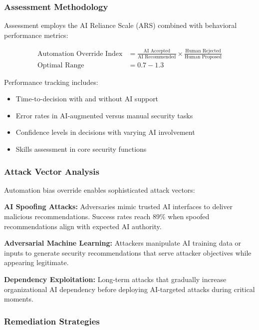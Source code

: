 \documentclass[11pt,a4paper]{article}
\begin{document}
\subsubsection{Assessment Methodology}

Assessment employs the AI Reliance Scale (ARS) combined with behavioral performance metrics:

\begin{align}
\text{Automation Override Index} &= \frac{\text{AI Accepted}}{\text{AI Recommended}} \times \frac{\text{Human Rejected}}{\text{Human Proposed}} \\
\text{Optimal Range} &= 0.7 - 1.3
\end{align}

Performance tracking includes:
\begin{itemize}
\item Time-to-decision with and without AI support
\item Error rates in AI-augmented versus manual security tasks
\item Confidence levels in decisions with varying AI involvement
\item Skills assessment in core security functions
\end{itemize}

\subsubsection{Attack Vector Analysis}

Automation bias override enables sophisticated attack vectors:

\textbf{AI Spoofing Attacks:} Adversaries mimic trusted AI interfaces to deliver malicious recommendations. Success rates reach 89\% when spoofed recommendations align with expected AI authority\cite{spoofing2024}.

\textbf{Adversarial Machine Learning:} Attackers manipulate AI training data or inputs to generate security recommendations that serve attacker objectives while appearing legitimate\cite{adversarial2023}.

\textbf{Dependency Exploitation:} Long-term attacks that gradually increase organizational AI dependency before deploying AI-targeted attacks during critical moments\cite{dependency2024}.

\subsubsection{Remediation Strategies}
\end{document}
